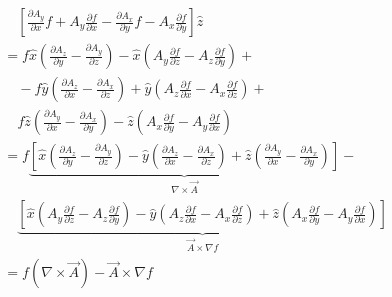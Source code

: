 \documentclass[12pt]{article}
\begin{document}
\begin{enumerate}
\begin{align*}
		                               & \quad \left[\frac{\partial A_y}{\partial x} f + A_y \frac{\partial f}{\partial x} - \frac{\partial A_x}{\partial y} f - A_x \frac{\partial f}{\partial y}\right] \hat{z}                                                                                                                                                                                       \\
		                               & = f \hat{x} \left(\frac{\partial A_z}{\partial y} - \frac{\partial A_y}{\partial z}\right) -\hat{x} \left(A_y \frac{\partial f}{\partial z} - A_z \frac{\partial f}{\partial y}\right) +                                                                                                                                                                       \\
		                               & \quad - f \hat{y} \left(\frac{\partial A_z}{\partial x} - \frac{\partial A_x}{\partial z}\right) + \hat{y} \left(A_z \frac{\partial f}{\partial x} - A_x\frac{\partial f}{\partial z}\right) +                                                                                                                                                                 \\
		                               & \quad f \hat{z} \left(\frac{\partial A_y}{\partial x} - \frac{\partial A_x}{\partial y}\right) - \hat{z} \left(A_x \frac{\partial f}{\partial y} - A_y \frac{\partial f}{\partial x}\right)                                                                                                                                                                    \\
		                               & = f \underbrace{\left[\hat{x} \left(\frac{\partial A_z}{\partial y} - \frac{\partial A_y}{\partial z}\right) - \hat{y} \left(\frac{\partial A_z}{\partial x} - \frac{\partial A_x}{\partial z}\right) + \hat{z} \left(\frac{\partial A_y}{\partial x} - \frac{\partial A_x}{\partial y}\right)\right]}_{\nabla \times \vec{A}} -                               \\
		                               & \quad \underbrace{\left[\hat{x} \left(A_y \frac{\partial f}{\partial z} - A_z \frac{\partial f}{\partial y}\right) - \hat{y} \left(A_z \frac{\partial f}{\partial x} - A_x\frac{\partial f}{\partial z}\right) + \hat{z} \left(A_x \frac{\partial f}{\partial y} - A_y \frac{\partial f}{\partial x}\right)\right]}_{\vec{A} \times \nabla f}                  \\
		                               & = f(\nabla \times \vec{A}) - \vec{A} \times \nabla f
	      \end{align*}
\end{enumerate}
\end{document}
